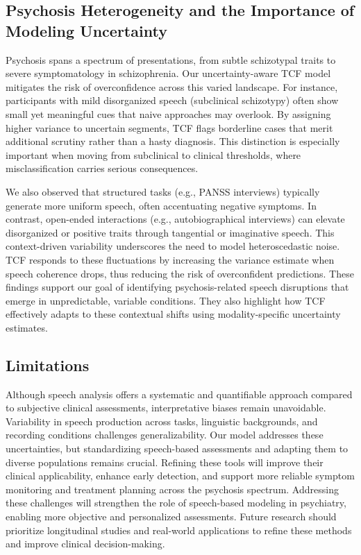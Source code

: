 \documentclass[9pt,a4paper]{rho-class/rho}
\begin{document}
\subsection{Psychosis Heterogeneity and the Importance of Modeling Uncertainty}
Psychosis spans a spectrum of presentations, from subtle schizotypal traits to severe symptomatology in schizophrenia. Our uncertainty-aware TCF model mitigates the risk of overconfidence across this varied landscape. For instance, 
participants with mild disorganized speech (subclinical schizotypy) often show small yet meaningful cues that naive approaches may overlook. By assigning higher variance to uncertain segments, TCF flags borderline cases that merit 
additional scrutiny rather than a hasty diagnosis. This distinction is especially important when moving from subclinical to clinical thresholds, where misclassification carries serious consequences.

We also observed that structured tasks (e.g., PANSS interviews) typically generate more uniform speech, often accentuating negative symptoms. In contrast, open-ended interactions (e.g., autobiographical interviews) can elevate disorganized or 
positive traits through tangential or imaginative speech. This context-driven variability underscores the need to model heteroscedastic noise. TCF responds to these fluctuations by increasing the variance estimate when speech coherence drops, 
thus reducing the risk of overconfident predictions. These findings support our goal of identifying psychosis-related speech disruptions that emerge in unpredictable, variable conditions. They also highlight how TCF effectively adapts to these contextual shifts using modality-specific uncertainty estimates.

\subsection{Limitations}
Although speech analysis offers a systematic and quantifiable approach compared to subjective clinical assessments, interpretative biases remain unavoidable. Variability in speech production across tasks, linguistic backgrounds, and recording conditions challenges generalizability. Our model addresses these uncertainties, but standardizing speech-based assessments and adapting them to diverse populations remains crucial. Refining these tools will improve their clinical applicability, enhance early detection, and support more reliable symptom monitoring and treatment planning across the psychosis spectrum. Addressing these challenges will strengthen the role of speech-based modeling in psychiatry, enabling more objective and personalized assessments. Future research should prioritize longitudinal studies and real-world applications to refine these methods and improve clinical decision-making.
\end{document}
